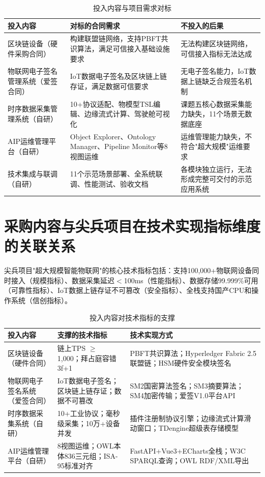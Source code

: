 \documentclass[12pt,a4paper]{ctexart}
\begin{document}
\begin{table}[H]
\centering
\caption{投入内容与项目需求对标}
\begin{tabular}{@{}p{3cm} p{5cm} p{5cm}@{}}
\toprule
\textbf{投入内容} & \textbf{对标的合同需求} & \textbf{不投入的后果} \\
\midrule
区块链设备（硬件采购合同） & 构建联盟链网络，支持PBFT共识算法，满足可信接入基础设施要求 & 无法构建区块链网络，可信接入指标无法达成 \\
\addlinespace
物联网电子签名管理系统（爱签合同） & IoT数据电子签名及区块链上链存证，满足数据可信要求 & 无电子签名能力，IoT数据上链缺乏合规签名机制 \\
\addlinespace
时序数据采集管理系统（自研） & 10+协议适配、物模型TSL编辑、边缘流式计算、驾驶舱可视化 & 课题五核心数据采集能力缺失，11个场景无数据底座 \\
\addlinespace
AIP运维管理平台（自研） & Object Explorer、Ontology Manager、Pipeline Monitor等8视图运维 & 运维管理能力缺失，不符合"超大规模"运维要求 \\
\addlinespace
技术集成与联调（自研） & 11个示范场景部署、全系统联调、性能测试、验收文档 & 各模块独立运行，无法形成完整可交付的示范应用系统 \\
\bottomrule
\end{tabular}
\end{table}

\section{采购内容与尖兵项目在技术实现指标维度的关联关系}

尖兵项目"超大规模智能物联网"的核心技术指标包括：支持100,000+物联网设备同时接入（规模指标）、数据采集延迟$<$100ms（性能指标）、数据存储99.999\%可用（可靠性指标）、IoT数据上链存证不可篡改（安全指标）、全栈支持国产CPU和操作系统（信创指标）。

\begin{table}[H]
\centering
\caption{投入内容对技术指标的支撑}
\begin{tabular}{@{}p{3.5cm} p{4cm} p{5.5cm}@{}}
\toprule
\textbf{投入内容} & \textbf{支撑的技术指标} & \textbf{技术实现方式} \\
\midrule
区块链设备（硬件合同） & 链上TPS $\geq$ 1,000；拜占庭容错3f+1 & PBFT共识算法；Hyper\-ledger Fabric 2.5联盟链；HSM硬件安全模块签名 \\
\addlinespace
物联网电子签名系统（爱签合同） & IoT数据电子签名；区块链上链存证；数据不可篡改 & SM2国密算法签名；SM3摘要算法；SM4加密传输；爱签V1.0平台API \\
\addlinespace
时序数据采集系统（自研） & 10+工业协议；毫秒级采集；10万+设备并发 & 插件注册制协议引擎；边缘流式计算滑动窗口；TDengine超级表存储模型 \\
\addlinespace
AIP运维管理平台（自研） & 8视图运维；OWL本体836三元组；ISA-95标准对齐 & FastAPI+Vue3+ECharts全栈；W3C SPARQL查询；OWL RDF/XML导出 \\
\bottomrule
\end{tabular}
\end{table}
\end{document}
